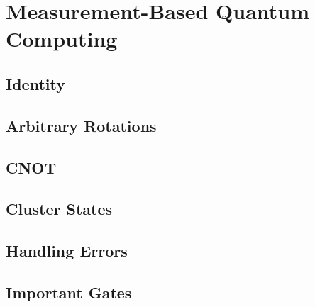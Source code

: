 \chapter{Measurement-Based Quantum Computing} %

	\section{Identity} %

	\section{Arbitrary Rotations} %

	\section{CNOT} %

	\section{Cluster States} %

	\section{Handling Errors} %

	\section{Important Gates} %
